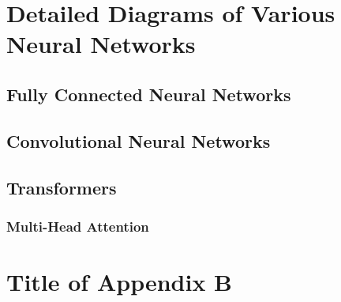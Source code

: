 \chapter{Detailed Diagrams of Various Neural Networks}
\label{chap:NNArch}
\section{Fully Connected Neural Networks}
\label{app:FCN}


\section{Convolutional Neural Networks}
\label{app:CNN}


\section{Transformers}
\label{app:transformer}

\subsection{Multi-Head Attention}
\label{app:MHA}


\chapter{Title of Appendix B}
